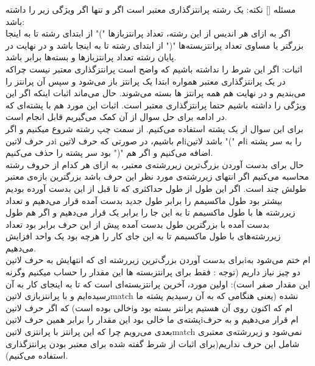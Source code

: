 

‌مسئله []
نکته: یک رشته پرانتزگذاری معتبر است اگر و تنها اگر ویژگی زیر را داشته باشد:
\\اگر به ازای هر اندیس از این رشته، تعداد پرانتزبازها ")" از ابتدای رشته تا به اینجا بزرگتر یا مساوی تعداد پرانتزبسته‌ها "(" از ابتدای رشته تا به اینجا باشد و در نهایت در پایان رشته تعداد پرانتزبازها و بسته‌ها برابر باشد.
\\اثبات: اگر این شرط را نداشته باشیم که واضح است پرانتزگذاری معتبر نیست چراکه در یک پرانتزگذاری معتبر همواره ابتدا یک پرانتز باز می‌شود و سپس آن پرانتز را می‌بندیم و در نهایت هم همه پرانتز ها بسته می‌شوند. حال می‌ماند اثبات اینکه اگر این ویژگی را داشته باشیم حتما پرانتزگذاری معتبر است. اثبات این مورد هم با پشته‌ای که در ادامه برای حل سوال از آن کمک می‌گیریم قابل انجام است.
\\برای این سوال از یک پشته استفاده می‌کنیم. از سمت چپ رشته شروع میکنیم و اگر در حرف ‌لاتین{i} ام باشیم، در صورتی که حرف ‌لاتین{i}ام ")" باشد ‌لاتین{i} را به سر پشته اضافه می‌کنیم و اگر هم "("  بود سر پشته را حذف می‌کنیم. 
\\حال برای بدست آوردن بزرگ‌ترین زیررشته‌ی معتبر، به ازای هر کدام از حروف رشته محاسبه می‌کنیم اگر انتهای زیررشته‌ی مورد نظر این حرف باشد بزرگترین بازه‌ی معتبر طولش چند است. اگر این طول از طول حداکثری که تا قبل از این بدست آورده بودیم بیشتر بود طول ماکسیمم را برابر طول جدید بدست آمده قرار می‌دهیم و تعداد زیررشته ها با طول ماکسیمم تا به این جا را برابر یک قرار می‌دهیم و اگر هم طول بدست آمده با بزرگترین طول بدست آمده پیش از این حرف برابر بود تعداد زیررشته‌های با طول ماکسیمم تا به این جای کار را هرچه بود یک واحد افزایش می‌دهیم.
\\برای بدست آوردن بزرگ‌ترین زیررشته ای که انتهایش به حرف ‌لاتین{i}ام ختم می‌شود به دو چیز نیاز داریم (توجه :‌ فقط برای پرانتزبسته ها این مقدار را حساب میکنیم وگرنه این مقدار صفر است): اولین مورد، آخرین پرانتز‌بسته‌ای است که تا به اینجای کار به آن رسیده‌ایم و با پرانتز‌بازی ‌لاتین{match} نشده (یعنی هنگامی که به آن رسیدیم پشته ما خالی بوده است) که اگر حرف ‌لاتین{i}ام که اکنون روی آن هستیم پرانتر بسته بود و پشته‌ی ما خالی بود این مقدار را برابر همین حرف ‌لاتین{i}ام قرار می‌دهیم و به حرف بعدی می‌رویم چرا که این پرانتز با پرانتزی ‌لاتین{match} نمی‌شود و زیررشته‌ی معتبری شامل این حرف نداریم(برای اثبات از شرط گفته شده برای معتبر بودن پرانتزگذاری استفاده می‌کنیم).
